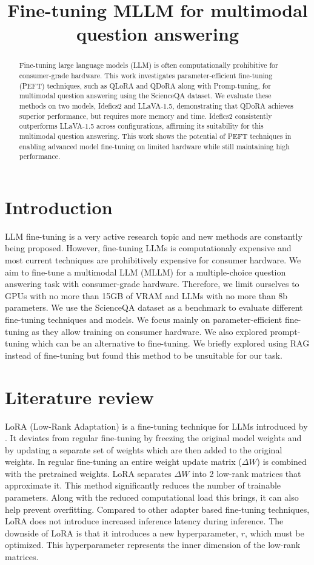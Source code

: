 \documentclass{article}
\title{Fine-tuning MLLM for multimodal question answering}
\begin{document}
%
\maketitle
%
\begin{abstract}
Fine-tuning large language models (LLM) is often computationally prohibitive for consumer-grade hardware. This work investigates parameter-efficient fine-tuning (PEFT) techniques, such as QLoRA and QDoRA along with Promp-tuning, for multimodal question answering using the ScienceQA dataset. We evaluate these methods on two models, Idefics2 and LLaVA-1.5, demonstrating that QDoRA achieves superior performance, but requires more memory and time. Idefics2 consistently outperforms LLaVA-1.5 across configurations,
affirming its suitability for this multimodal question answering.
This work shows the potential of PEFT techniques in enabling advanced model fine-tuning on limited hardware while still maintaining high performance.
\end{abstract}
%
%
\section{Introduction}
\label{sec:intro}
LLM fine-tuning is a very active research topic and new methods are constantly being proposed. However, fine-tuning LLMs is computationaly expensive and most current techniques are prohibitively expensive for consumer hardware. We aim to fine-tune a multimodal LLM (MLLM) for a multiple-choice question answering task with consumer-grade hardware. Therefore, we limit ourselves to GPUs with no more than 15GB of VRAM and LLMs with no more than 8b parameters. We use the ScienceQA dataset as a benchmark to evaluate different fine-tuning techniques and models. We focus mainly on parameter-efficient fine-tuning as they allow training on consumer hardware. We also explored prompt-tuning which can be an alternative to fine-tuning. We briefly explored using RAG instead of fine-tuning but found this method to be unsuitable for our task.

\section{Literature review}
\label{sec:litreview}

LoRA (Low-Rank Adaptation) is a fine-tuning technique for LLMs introduced by \cite{lora}. It deviates from regular fine-tuning by freezing the original model weights and by updating a separate set of weights which are then added to the original weights. In regular fine-tuning an entire weight update matrix ($\Delta W$) is combined with the pretrained weights. LoRA separates $\Delta W$ into 2 low-rank matrices that approximate it. This method significantly reduces the number of trainable parameters. Along with the reduced computational load this brings, it can also help prevent overfitting. Compared to other adapter based fine-tuning techniques, LoRA does not introduce increased inference latency during inference. The downside of LoRA is that it introduces a new hyperparameter, $r$, which must be optimized. This hyperparameter represents the inner dimension of the low-rank matrices.\par
\end{document}
